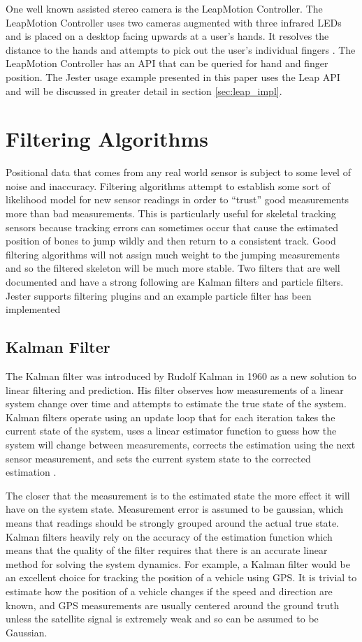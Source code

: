 One well known assisted stereo camera is the LeapMotion Controller. The LeapMotion Controller uses two cameras augmented with three infrared LEDs and is placed on a desktop facing upwards at a user’s hands. It resolves the distance to the hands and attempts to pick out the user’s individual fingers \cite{weichert2013analysis}. The LeapMotion Controller has an API that can be queried for hand and finger position. The Jester usage example presented in this paper uses the Leap API and will be discussed in greater detail in section \ref{sec:leap_impl}.

\section{Filtering Algorithms}

Positional data that comes from any real world sensor is subject to some level of noise and inaccuracy. Filtering algorithms attempt to establish some sort of likelihood model for new sensor readings in order to “trust” good measurements more than bad measurements. This is particularly useful for skeletal tracking sensors because tracking errors can sometimes occur that cause the estimated position of bones to jump wildly and then return to a consistent track. Good filtering algorithms will not assign much weight to the jumping measurements and so the filtered skeleton will be much more stable. Two filters that are well documented and have a strong following are Kalman filters and particle filters. Jester supports filtering plugins and an example particle filter has been implemented

\subsection{Kalman Filter}

The Kalman filter was introduced by Rudolf Kalman in 1960 as a new solution to linear filtering and prediction. His filter observes how measurements of a linear system change over time and attempts to estimate the true state of the system. Kalman filters operate using an update loop that for each iteration takes the current state of the system, uses a linear estimator function to guess how the system will change between measurements, corrects the estimation using the next sensor measurement, and sets the current system state to the corrected estimation \cite{kalman1960new}. 

The closer that the measurement is to the estimated state the more effect it will have on the system state. Measurement error is assumed to be gaussian, which means that readings should be strongly grouped around the actual true state. Kalman filters heavily rely on the accuracy of the estimation function which means that the quality of the filter requires that there is an accurate linear method for solving the system dynamics. For example, a Kalman filter would be an excellent choice for tracking the position of a vehicle using GPS. It is trivial to estimate how the position of a vehicle changes if the speed and direction are known, and GPS measurements are usually centered around the ground truth unless the satellite signal is extremely weak and so can be assumed to be Gaussian. 

